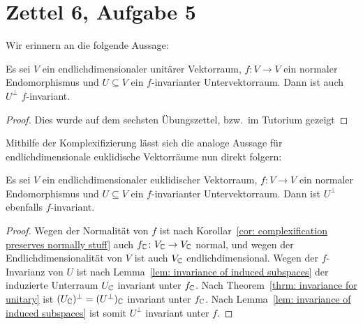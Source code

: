 \documentclass[a4paper,10pt,numbers=noenddot]{scrartcl}
\begin{document}
\section{Zettel 6, Aufgabe 5}


Wir erinnern an die folgende Aussage:


\begin{theorem}\label{thrm: invariance for unitary}
  Es sei $V$ ein endlichdimensionaler unitärer Vektorraum, $f \colon V \to V$ ein normaler Endomorphismus und $U \subseteq V$ ein $f$-invarianter Untervektorraum.
  Dann ist auch $U^\perp$ $f$-invariant.
\end{theorem}


\begin{proof}
  Dies wurde auf dem sechsten Übungszettel, bzw.\ im Tutorium gezeigt
\end{proof}


Mithilfe der Komplexifizierung lässt sich die analoge Aussage für endlichdimensionale euklidische Vektorräume nun direkt folgern:


\begin{corollary}
  Es sei $V$ ein endlichdimensionaler euklidischer Vektorraum, $f \colon V \to V$ ein normaler Endomorphismus und $U \subseteq V$ ein $f$-invarianter Untervektorraum.
  Dann ist $U^\perp$ ebenfalls $f$-invariant.
\end{corollary}


\begin{proof}
  Wegen der Normalität von $f$ ist nach Korollar~\ref{cor: complexification preserves normally stuff} auch $f_{\mathbb{C}} \colon V_{\mathbb{C}} \to V_{\mathbb{C}}$ normal, und wegen der Endlichdimensionalität von $V$ ist auch $V_{\mathbb{C}}$ endlichdimensional.
  Wegen der $f$-Invarianz von $U$ ist nach Lemma~\ref{lem: invariance of induced subspaces} der induzierte Unterraum $U_{\mathbb{C}}$ invariant unter $f_{\mathbb{C}}$.
  Nach Theorem~\ref{thrm: invariance for unitary} ist $(U_{\mathbb{C}})^\perp = (U^\perp)_{\mathbb{C}}$ invariant unter $f_{\mathbb{C}}$.
  Nach Lemma~\ref{lem: invariance of induced subspaces} ist somit $U^\perp$ invariant unter $f$.
\end{proof}
\end{document}
